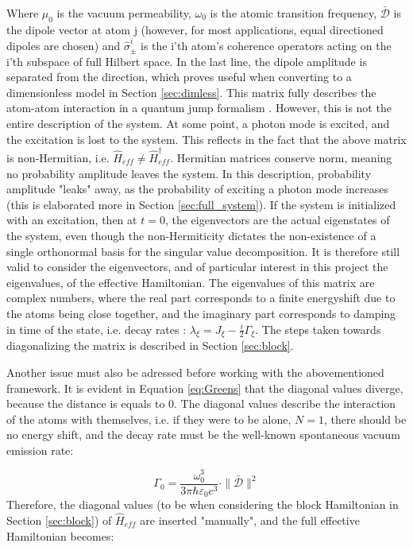 \documentclass{article}
\begin{document}
Where $\mu_0$ is the vacuum permeability, $\omega_0$ is the atomic transition frequency, $\bar{\mathscr{D}}$ is the dipole vector at atom j (however, for most applications, equal directioned dipoles are chosen) and $\hat{\sigma}_\pm^i$ is the i'th atom's coherence operators acting on the i'th subspace of full Hilbert space. In the last line, the dipole amplitude is separated from the direction, which proves useful when converting to a dimensionless model in Section \ref{sec:dimless}. This matrix fully describes the atom-atom interaction in a quantum jump formalism \cite{Asenjo}. However, this is not the entire description of the system. At some point, a photon mode is excited, and the excitation is lost to the system. This reflects in the fact that the above matrix is non-Hermitian, i.e. $\hat{H}_{eff} \neq \hat{H}_{eff}^\dagger$. Hermitian matrices conserve norm, meaning no probability amplitude leaves the system. In this description, probability amplitude "leaks" away, as the probability of exciting a photon mode increases (this is elaborated more in Section \ref{sec:full_system}). If the system is initialized with an excitation, then at $t=0$, the eigenvectors are the actual eigenstates of the system, even though the non-Hermiticity dictates the non-existence of a single orthonormal basis for the singular value decomposition. It is therefore still valid to consider the eigenvectors, and of particular interest in this project the eigenvalues, of the effective Hamiltonian. The eigenvalues of this matrix are complex numbers, where the real part corresponds to a finite energyshift due to the atoms being close together, and the imaginary part corresponds to damping in time of the state, i.e. decay rates \cite[Equation 7]{Asenjo}: $\lambda_\xi = J_\xi - \frac{i}{2} \Gamma_\xi$. The steps taken towards diagonalizing the matrix is described in Section \ref{sec:block}. 

Another issue must also be adressed before working with the abovementioned framework. It is evident in Equation \ref{eq:Greens} that the diagonal values diverge, because the distance is equals to 0. The diagonal values describe the interaction of the atoms with themselves, i.e. if they were to be alone, $N = 1$, there should be no energy shift, and the decay rate must be the well-known spontaneous vacuum emission rate:

\begin{equation}\label{eq:vac_emission_rate}
    \Gamma_0 = \frac{\omega_0^3}{3\pi \hbar \varepsilon_0 c^3} \cdot \|\bar{\mathscr{D}}\|^2
\end{equation}
Therefore, the diagonal values (to be when considering the block Hamiltonian in Section \ref{sec:block}) of $\hat{H}_{eff}$ are inserted "manually", and the full effective Hamiltonian becomes:
\end{document}
